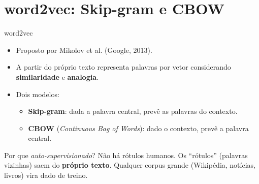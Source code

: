 \section{word2vec: Skip-gram e CBOW}

\begin{frame}{word2vec \cite{mikolov2013efficient, mikolov2013distributed}}
    \begin{itemize}
        \item Proposto por Mikolov et al. (Google, 2013).
        \item A partir do próprio texto representa palavras por vetor considerando \textbf{similaridade} e \textbf{analogia}.
        \item Dois modelos:
        \begin{itemize}
            \item \textbf{Skip-gram}: dada a palavra central, prevê as palavras do contexto.
            \item \textbf{CBOW} (\textit{Continuous Bag of Words}): dado o contexto, prevê a palavra central.
        \end{itemize}
    \end{itemize}

    \begin{block}{Por que \textit{auto-supervisionado}?}
        Não há rótulos humanos. Os ``rótulos'' (palavras vizinhas) saem do \textbf{próprio texto}. Qualquer corpus grande (Wikipédia, notícias, livros) vira dado de treino.
    \end{block}
\end{frame}

